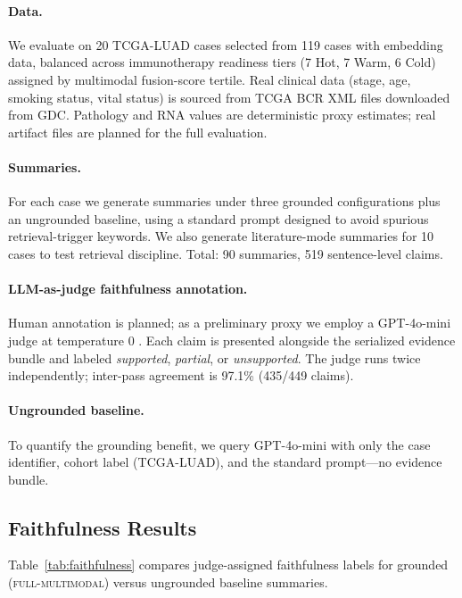 \documentclass[11pt,twocolumn]{article}
\begin{document}
\paragraph{Data.}
We evaluate on 20 TCGA-LUAD cases \cite{tcga2014luad} selected from
119 cases with embedding data, balanced across immunotherapy readiness
tiers (7 Hot, 7 Warm, 6 Cold) assigned by multimodal fusion-score
tertile. Real clinical data (stage, age, smoking status, vital status)
is sourced from TCGA BCR XML files downloaded from GDC. Pathology and RNA values are deterministic proxy estimates; real artifact files are planned for the full
evaluation.

\paragraph{Summaries.}
For each case we generate summaries under three grounded configurations
plus an ungrounded baseline, using a standard prompt designed to avoid
spurious retrieval-trigger keywords. We also
generate literature-mode summaries for 10 cases to test retrieval
discipline. Total: 90 summaries, 519 sentence-level claims.

\paragraph{LLM-as-judge faithfulness annotation.}
Human annotation is planned; as a preliminary proxy we employ a
GPT-4o-mini judge at temperature 0 \cite{zheng2023judging}. Each
claim is presented alongside the serialized evidence bundle and labeled
\emph{supported}, \emph{partial}, or \emph{unsupported}. The judge runs twice
independently; inter-pass agreement is 97.1\% (435/449 claims).

\paragraph{Ungrounded baseline.}
To quantify the grounding benefit, we query GPT-4o-mini with only the
case identifier, cohort label (TCGA-LUAD), and the standard prompt—no
evidence bundle.

\subsection{Faithfulness Results}

Table~\ref{tab:faithfulness} compares judge-assigned faithfulness labels
for grounded (\textsc{full-multimodal}) versus ungrounded baseline
summaries.
\end{document}
